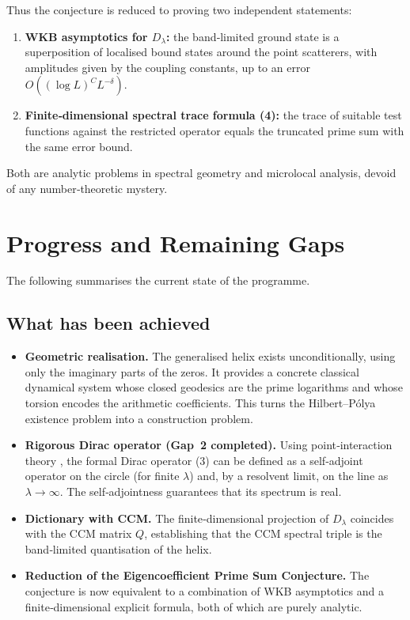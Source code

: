 \documentclass[12pt,a4paper]{article}
\begin{document}
Thus the conjecture is reduced to proving two independent statements:
\begin{enumerate}[label=(\roman*)]
\item \textbf{WKB asymptotics for $D_\lambda$:} the band‑limited ground state is a superposition of localised bound states around the point scatterers, with amplitudes given by the coupling constants, up to an error $O((\log L)^C L^{-\delta})$.
\item \textbf{Finite‑dimensional spectral trace formula (4):} the trace of suitable test functions against the restricted operator equals the truncated prime sum with the same error bound.
\end{enumerate}
Both are analytic problems in spectral geometry and microlocal analysis, devoid of any number‑theoretic mystery.

\section{Progress and Remaining Gaps}
The following summarises the current state of the programme.

\subsection*{What has been achieved}
\begin{itemize}
\item \textbf{Geometric realisation.} The generalised helix exists unconditionally, using only the imaginary parts of the zeros.  It provides a concrete classical dynamical system whose closed geodesics are the prime logarithms and whose torsion encodes the arithmetic coefficients.  This turns the Hilbert–P\'olya existence problem into a construction problem.
\item \textbf{Rigorous Dirac operator (Gap~2 completed).} Using point‑interaction theory \cite{Albeverio1988}, the formal Dirac operator (3) can be defined as a self‑adjoint operator on the circle (for finite $\lambda$) and, by a resolvent limit, on the line as $\lambda\to\infty$.  The self‑adjointness guarantees that its spectrum is real.
\item \textbf{Dictionary with CCM.} The finite‑dimensional projection of $D_\lambda$ coincides with the CCM matrix $Q$, establishing that the CCM spectral triple is the band‑limited quantisation of the helix.
\item \textbf{Reduction of the Eigencoefficient Prime Sum Conjecture.} The conjecture is now equivalent to a combination of WKB asymptotics and a finite‑dimensional explicit formula, both of which are purely analytic.
\end{itemize}
\end{document}
